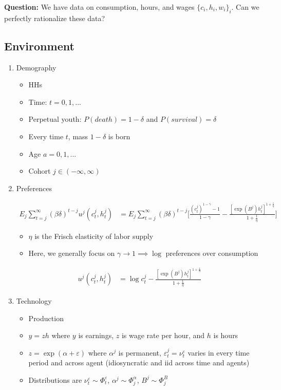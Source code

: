 \documentclass{article}
\begin{document}
\bigskip

\textbf{Question:} We have data on consumption, hours, and wages $\{c_i, h_i, w_i\}_i$. Can we perfectly rationalize these data?

\subsection*{Environment}

\begin{enumerate}

\item Demography

\begin{itemize}
\item HHs
\item Time: $t=0,1,...$
\item Perpetual youth: $P(death) = 1 - \delta$ and $P(survival) = \delta$
\item Every time $t$, mass $1-\delta$ is born
\item Age $a = 0, 1,...$
\item Cohort $j \in (-\infty, \infty)$
\end{itemize}

\item Preferences

\begin{align*}
E_j \sum_{t=j}^\infty (\beta \delta)^{t-j} u^j(c_t^j, h_t^j) 
&= 
E_j \sum_{t=j}^\infty (\beta \delta)^{t-j} \Bigg[\frac{(c_t^j)^{1-\gamma}-1}{1-\gamma} - \frac{[\exp(B^j) h_t^j]^{1+\frac{1}{\eta}}}{1+\frac{1}{\eta}} \Bigg]
\end{align*}
\begin{itemize}
\item $\eta$ is the Frisch elasticity of labor supply
\item Here, we generally focus on $\gamma \to 1 \implies \log$ preferences over consumption
\end{itemize}
\begin{align*}
u^j(c_t^j, h_t^j) 
&= 
\log c_t^j - \frac{[\exp(B^j) h_t^j]^{1+\frac{1}{\eta}}}{1+\frac{1}{\eta}}
\end{align*}

\item Technology

\begin{itemize}
\item Production
\item $y = zh$ where $y$ is earnings, $z$ is wage rate per hour, and $h$ is hours
\item $z = \exp(\alpha + \varepsilon)$ where $\alpha^j$ is permanent, $\varepsilon_t^j = \nu_t^\varepsilon$ varies in every time period and across agent (idiosyncratic and iid across time and agents)
\item Distributions are $\nu_t^\varepsilon \sim \Phi_t^\varepsilon$, $\alpha^j \sim \Phi_j^\alpha$, $B^j \sim \Phi_j^B$ 
\end{itemize}


\end{enumerate}
\end{document}
